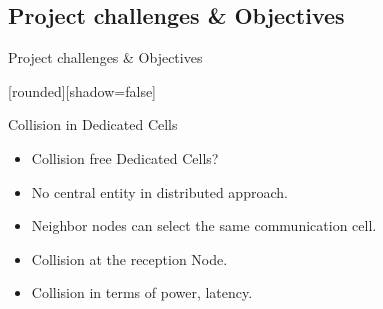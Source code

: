 
\subsection{Project challenges \& Objectives}
\begin{withoutheadline}
\begin{frame}{Project challenges \& Objectives}


[rounded][shadow=false]

\begin{block}{Collision in Dedicated Cells}
    \begin{itemize}
    \item Collision free Dedicated Cells?  
    \item<2-> No central entity in distributed approach.
    \item<3-> Neighbor nodes can select the same communication cell.
    \item<5-> Collision at the reception Node.
    \item<6-> Collision in terms of power, latency. 
    \end{itemize}
    \end{block}

\begin{figure}[p]

  

\end{figure}
\end{frame}
\end{withoutheadline}
